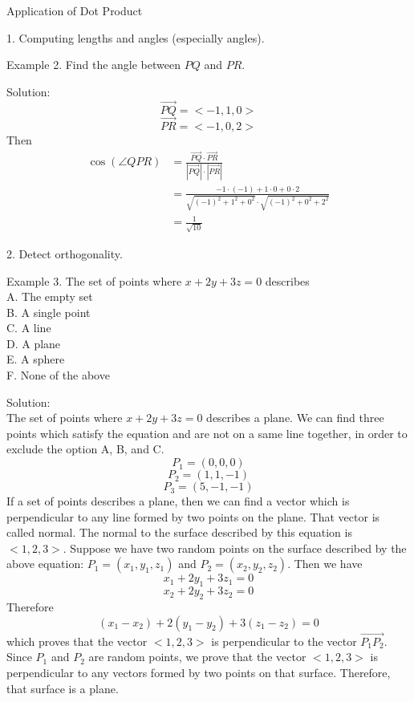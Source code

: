 \documentclass{article}
\begin{document}
\bigskip
Application of Dot Product

1. Computing lengths and angles (especially angles).
    
Example 2. Find the angle between $PQ$ and $PR$.

Solution:
\[ \vec{PQ} = <-1, 1, 0> \]
\[ \vec{PR} = < -1, 0, 2> \]
Then
\[ \begin{split}
    \cos(\angle QPR) &= \frac{\vec{PQ} \cdot \vec{PR}}{|\vec{PQ}| \cdot
                            |\vec{PR}|} \\
                     &= \frac{-1 \cdot (-1) + 1 \cdot 0 + 0 \cdot 2}
                            {\sqrt{(-1)^{2} + 1^{2} + 0^{2}} \cdot 
                            \sqrt{(-1)^{2} + 0^{2} + 2^{2}}} \\
                     &= \frac{1}{\sqrt{10}}
\end{split} \]

2. Detect orthogonality.

Example 3. The set of points where $x + 2y + 3z = 0$ describes \\
A. The empty set \\
B. A single point \\
C. A line \\
D. A plane \\
E. A sphere \\
F. None of the above

Solution:\\
The set of points where $x + 2y + 3z = 0$ describes a plane. We can find three
points which satisfy the equation and are not on a same line together, in order
to exclude the option A, B, and C.
\[ P_1 = (0, 0, 0) \]
\[ P_2 = (1, 1, -1) \]
\[ P_3 = (5, -1, -1) \]
If a set of points describes a plane, then we can find a vector which is
perpendicular to any line formed by two points on the plane. That vector is
called normal. The normal to the surface described by this equation is
$<1, 2, 3>$. Suppose we have two random points on the surface described by the
above equation: $P_{1} = (x_{1}, y_{1}, z_{1})$ and $P_{2} = (x_{2}, y_{2},
z_{2})$. Then we have
\[ x_{1} + 2y_{1} + 3z_{1} = 0 \]
\[ x_{2} + 2y_{2} + 3z_{2} = 0 \]
Therefore
\[ (x_{1} - x_{2}) + 2(y_{1} - y_{2}) + 3(z_{1} - z_{2}) = 0 \]
which proves that the vector $<1, 2, 3>$ is perpendicular to the vector
$\vec{P_{1}P_{2}}$. Since $P_{1}$ and $P_{2}$ are random points, we prove that
the vector $<1, 2, 3>$ is perpendicular to any vectors formed by two points on
that surface. Therefore, that surface is a plane.
\end{document}
